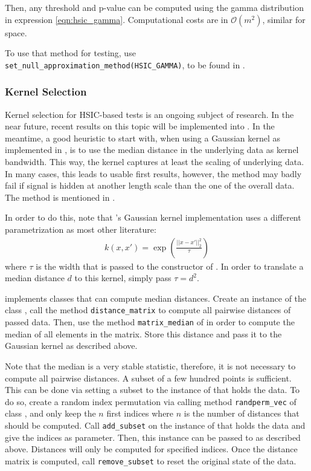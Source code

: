 Then, any threshold and p-value can be computed using the gamma distribution in expression \ref{eqn:hsic_gamma}. Computational costs are in $\mathcal{O}(m^2)$, similar for space.

To use that method for testing, use \texttt{set\_null\_approximation\_method(HSIC\_GAMMA)}, to be found in .

\subsubsection{Kernel Selection}
Kernel selection for HSIC-based tests is an ongoing subject of research. In the near future, recent results on this topic will be implemented into \shogun{}. In the meantime, a good heuristic to start with, when using a Gaussian kernel as implemented in , is to use the median distance in the underlying data as kernel bandwidth. This way, the kernel captures at least the scaling of underlying data. In many cases, this leads to usable first results, however, the method may badly fail if signal is hidden at another length scale than the one of the overall data. The method is mentioned in \citep[Appendix C]{Gretton2012}.

In order to do this, note that  \shogun{}'s Gaussian kernel implementation uses a different parametrization as most other literature:
\begin{align*}
k(x,x')=\exp\left( \frac{||x-x'||_2^2}{\tau}\right)
\end{align*}
where $\tau$ is the width that is passed to the constructor of . In order to translate a median distance $d$ to this kernel, simply pass $\tau=d^2$.

\shogun{} implements classes that can compute median distances. Create an instance of the class , call the method \texttt{distance\_matrix} to compute all pairwise distances of passed data. Then, use the method \texttt{matrix\_median} of   in order to compute the median of all elements in the matrix. Store this distance and pass it to the Gaussian kernel as described above.

Note that the median is a very stable statistic, therefore, it is not necessary to compute all pairwise distances. A subset of a few hundred points is sufficient. This can be done via setting a subset to the instance of  that holds the data. To do so, create a random index permutation via calling method \texttt{randperm\_vec} of class , and only keep the $n$ first indices where $n$ is the number of distances that should be computed. Call \texttt{add\_subset} on the instance of  that holds the data and give the indices as parameter. Then, this instance can be passed to  as described above. Distances will only be computed for specified indices. Once the distance matrix is computed, call \texttt{remove\_subset} to reset the original state of the data.

